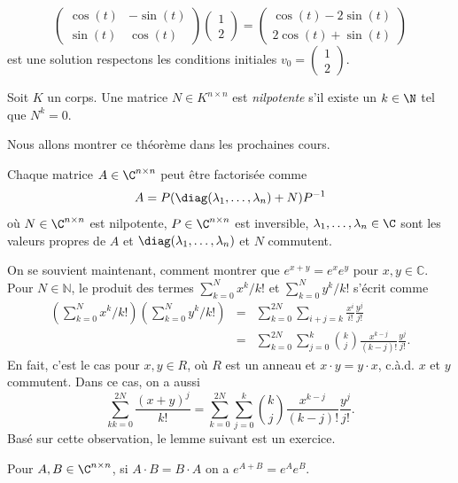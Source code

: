 \begin{example}
\begin{displaymath}
\begin{pmatrix}
    \cos(t)&-\sin(t)\\
    \sin(t)&\cos(t)
  \end{pmatrix} \begin{pmatrix}
    1\\
    2
\end{pmatrix}   =  \begin{pmatrix}
    \cos(t)-2\sin(t)\\
    2\cos(t)+\sin(t)
\end{pmatrix} 
\end{displaymath}
est une solution respectons les conditions initiales  $v_0 = 
\begin{pmatrix}
    1\\
    2
\end{pmatrix} $. 
\end{example}






\begin{definition}
  \label{def:29}Soit $K$ un corps. 
  Une matrice $N ∈ K^{n ×n}$ est \emph{nilpotente} s'il existe un $k \in \N$ tel que $N^k = 0$. 
\end{definition}

Nous allons montrer ce théorème dans les prochaines cours.  
\begin{theorem}
  \label{thr:32}
  Chaque matrice $A \in \C^{n \times n}$ peut être factorisée comme 
  \begin{displaymath}
    A = P ( \diag(\lambda_1,\dots,\lambda_n) + N) P^{-1}
  \end{displaymath}
où $N \in \C^{n \times n}$ est nilpotente, $P \in \C^{n \times n}$ est inversible,  $\lambda_1,\dots,\lambda_n \in \C$ sont les valeurs propres de $A$ et $\diag(\lambda_1,\dots,\lambda_n)$ et $N$ commutent. 
\end{theorem}
%
On se souvient maintenant, comment montrer que $e^{x+y}  = e^xe^y$ pour $x,y∈ ℂ$.  Pour $N ∈ ℕ$, le produit des termes
$∑_{k=0}^N x^k / k! $ et $∑_{k=0}^N y^k / k! $ s'écrit comme 
\begin{eqnarray}
  \left(∑_{k=0}^N x^k / k! \right) \left(∑_{k=0}^N y^k / k! \right) & = & \displaystyle  ∑_{k=0}^{2N}  ∑_{i+j = k} \frac{x^i}{  i!} \frac{y^j}{ j!} \\
  & = &  \displaystyle ∑_{k=0}^{2N}  ∑_{j = 0}^k \binom{k}{j} \frac{x^{k-j} }{(k-j)!} \frac{y^{j} }{j!}.   
\end{eqnarray}
En fait, c'est le cas pour $x,y ∈ R$, où $R$ est un anneau et $x ⋅ y  = y ⋅x$, c.à.d. $x$ et $y$ commutent.  Dans ce cas, on a aussi
\begin{displaymath}
  \displaystyle  ∑_{kk=0}^{2N} \frac{(x+y)^j}{k!} =  \displaystyle  ∑_{k=0}^{2N}  ∑_{j = 0}^k \binom{k}{j} \frac{x^{k-j} }{(k-j)!} \frac{y^{j} }{j!}.   
\end{displaymath}
%
Basé sur cette observation, le lemme suivant est un exercice. 
\begin{lemma}
  \label{lem:18}
  Pour $A,B \in \C^{n \times n}$, si $A\cdot B = B \cdot A$ on a $e^{A+B} = e^A e^B$. 
\end{lemma}



